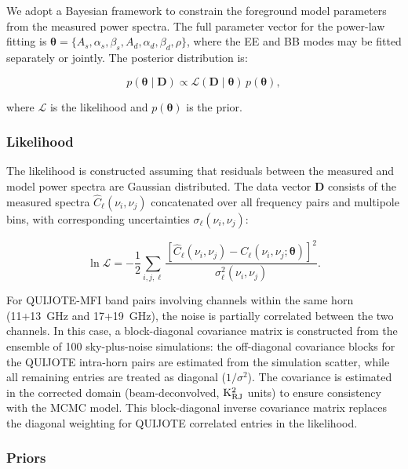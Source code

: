 We adopt a Bayesian framework to constrain the foreground model parameters from the measured power spectra. The full parameter vector for the power-law fitting is $\boldsymbol{\theta} = \{A_s, \alpha_s, \beta_s, A_d, \alpha_d, \beta_d, \rho\}$, where the EE and BB modes may be fitted separately or jointly. The posterior distribution is:

\begin{equation}
p(\boldsymbol{\theta} \mid \mathbf{D}) \propto \mathcal{L}(\mathbf{D} \mid \boldsymbol{\theta})\, p(\boldsymbol{\theta}),
\end{equation}

where $\mathcal{L}$ is the likelihood and $p(\boldsymbol{\theta})$ is the prior.

\subsubsection{Likelihood}

The likelihood is constructed assuming that residuals between the measured and model power spectra are Gaussian distributed. The data vector $\mathbf{D}$ consists of the measured spectra $\hat{C}_\ell(\nu_i, \nu_j)$ concatenated over all frequency pairs and multipole bins, with corresponding uncertainties $\sigma_\ell(\nu_i, \nu_j)$:

\begin{equation}
\ln \mathcal{L} = -\frac{1}{2} \sum_{i,j,\ell} \frac{[\hat{C}_\ell(\nu_i, \nu_j) - C_\ell(\nu_i, \nu_j;\boldsymbol{\theta})]^2}{\sigma^2_\ell(\nu_i, \nu_j)}.
\end{equation}

For QUIJOTE-MFI band pairs involving channels within the same horn (11+13~GHz and 17+19~GHz), the noise is partially correlated between the two channels. In this case, a block-diagonal covariance matrix is constructed from the ensemble of 100 sky-plus-noise simulations: the off-diagonal covariance blocks for the QUIJOTE intra-horn pairs are estimated from the simulation scatter, while all remaining entries are treated as diagonal ($1/\sigma^2$). The covariance is estimated in the corrected domain (beam-deconvolved, $\mathrm{K}_{\rm RJ}^2$ units) to ensure consistency with the MCMC model. This block-diagonal inverse covariance matrix replaces the diagonal weighting for QUIJOTE correlated entries in the likelihood.

\subsubsection{Priors}

